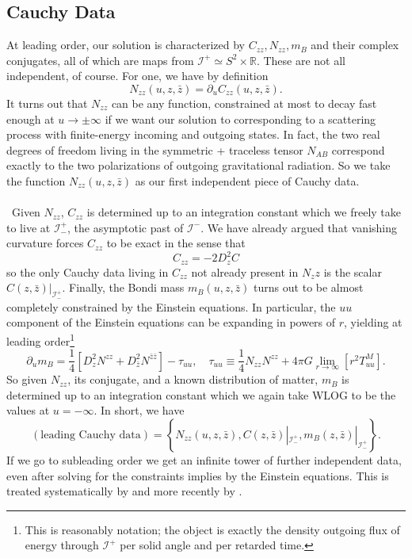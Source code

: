 \documentclass[11pt,letterpaper]{article}
\newcommand{\mc}[1]{\mathcal{#1}}
\newcommand{\R}{\mathbb{R}}
\newcommand{\D}{\partial}
\begin{document}
\subsection{Cauchy Data}
At leading order, our solution is characterized by $C_{zz}, N_{zz}, m_B$ and their complex conjugates, all of which are maps from $\mc{I}^+ \simeq S^2 \times \R$. These are not all independent, of course. For one, we have by definition \begin{equation}
N_{zz}(u, z, \bar{z}) = \D_u C_{zz} (u, z, \bar{z}).
\end{equation}
It turns out that $N_{zz}$ can be any function, constrained at most to decay fast enough at $u \to \pm \infty$ if we want our solution to corresponding to a scattering process with finite-energy incoming and outgoing states. In fact, the two real degrees of freedom living in the symmetric + traceless tensor $N_{AB}$ correspond exactly to the two polarizations of outgoing gravitational radiation. So we take the function $N_{zz}(u, z, \bar{z})$ as our first independent piece of Cauchy data. \\
\\
\
Given $N_{zz}$, $C_{zz}$ is determined  up to an integration constant which we freely take to live at $\mc{I}^+_-$, the asymptotic past of $\mc{I}^-$. We have already argued that vanishing curvature forces $C_{zz}$ to be exact in the sense that \begin{equation}
C_{zz} = - 2 D_z^2 C
\end{equation}
so the only Cauchy data living in $C_{zz}$ not already present in $N_zz$ is the scalar $C(z, \bar{z})|_{\mc{I}^+_-}$. Finally, the Bondi mass $m_B(u, z, \bar{z})$ turns out to be almost completely constrained by the Einstein equations. In particular, the $uu$ component of the Einstein equations can be expanding in powers of $r$, yielding at leading order\footnote{This is reasonably notation; the object is exactly the density outgoing flux of energy through $\mc{I}^+$ per solid angle and per retarded time.} \begin{equation}
\D_u m_B = \frac{1}{4} \left[ D_z^2 N^{zz} + D_{\bar{z}}^2 N^{\bar{z} \bar{z}} \right] - \tau_{uu}, \quad \tau_{uu} \equiv \frac{1}{4} N_{zz} N^{zz} + 4 \pi G \lim_{r \to \infty} \left[ r^2 T_{uu} ^M \right].
\end{equation} 
So given $N_{zz}$, its conjugate, and a known distribution of matter, $m_B$ is determined up to an integration constant which we again take WLOG to be the values at $u = - \infty$. In short, we have \begin{equation}
(\mbox{leading Cauchy data}) = \left\{ N_{zz}(u, z, \bar{z}), C(z, \bar{z})|_{\mc{I}^+_-}, m_B(z, \bar{z})|_{\mc{I}^+_-} \right\}.
\end{equation}
If we go to subleading order we get an infinite tower of further independent data, even after solving for the constraints implies by the Einstein equations. This is treated systematically by \cite{Barnich:2010eb} and more recently by \cite{Geiller:2024bgf}.
\end{document}
